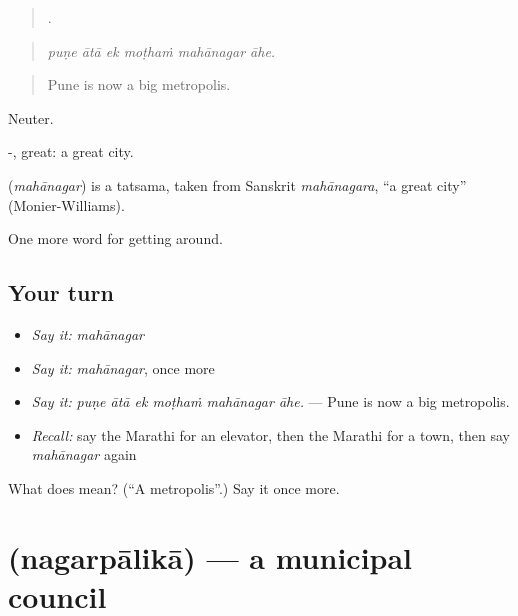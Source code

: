 \begin{quote}
     .
\end{quote}

\begin{quote}
\emph{puṇe ātā ek moṭhaṁ mahānagar āhe.}
\end{quote}

\begin{quote}
Pune is now a big metropolis.
\end{quote}

Neuter.

-, great: a great city.

\begin{cousinweb}
\textbf{} (\emph{mahānagar}) is a tatsama, taken from Sanskrit \emph{mahānagara}, \textquotedblleft{}a great city\textquotedblright{} (Monier-Williams).
\end{cousinweb}

\begin{grammarlens}[title={What you've built}]
One more word for getting around.
\end{grammarlens}

\subsection*{Your turn}
\begin{itemize}
\raggedright
  \item \emph{Say it:} \emph{mahānagar}
  \item \emph{Say it:} \emph{mahānagar}, once more
  \item \emph{Say it:} \emph{puṇe ātā ek moṭhaṁ mahānagar āhe.} — Pune is now a big metropolis.
  \item \emph{Recall:} say the Marathi for an elevator, then the Marathi for a town, then say \emph{mahānagar} again
\end{itemize}

\begin{tcolorbox}[breakable,colback=teal!4,colframe=teal!35!black,title={Before you move on}]
What does  mean? (\textquotedblleft{}A metropolis\textquotedblright{}.) Say it once more.
\end{tcolorbox}
\section[\texorpdfstring{\mr{नगरपालिका} (nagarpālikā)}{नगरपालिका (nagarpālikā)}]{ (nagarpālikā) — a municipal council}

